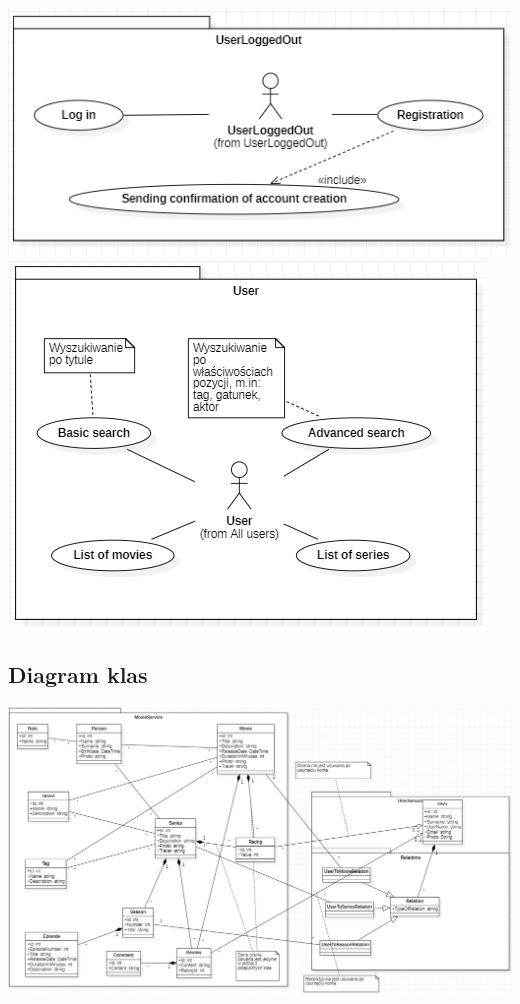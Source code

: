 \documentclass[12pt]{article}
\begin{document}
			\includegraphics[scale=0.9]{UseCase_UserNotLoggedIn.png} \linebreak
			\includegraphics[scale=0.9]{UseCase_User.png} \linebreak
		
		\subsection{Diagram klas}
			\begin{center}
				\includegraphics[scale=0.5]{Class_FilmsDataBase.png}
			\end{center}
		
\end{document}
